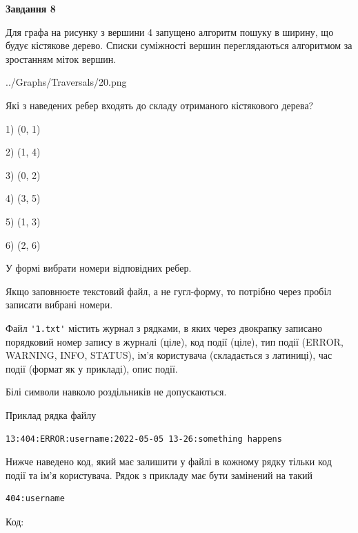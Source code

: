 \documentclass[12pt, ukrainian]{article}
\def\code#1{\Verb!#1!}
\begin{document}
{\begin {large}
{\begin {center}\textbf{Завдання 8}\end {center}}\par
Для графа на рисунку з вершини 4 запущено алгоритм пошуку в ширину, що будує кістякове дерево. Списки суміжності вершин переглядаються алгоритмом за зростанням міток вершин.\par
\begin{center}
	{../Graphs/Traversals/20.png}
\end{center}
\par Які з наведених ребер входять до складу отриманого кістякового дерева?\par
1) (0, 1)\par
2) (1, 4)\par
3) (0, 2)\par
4) (3, 5)\par
5) (1, 3)\par
6) (2, 6)\par
{\vskip 15pt} У формі вибрати номери відповідних ребер.


Якщо заповнюєте текстовий файл, а не гугл-форму, то потрібно через пробіл записа\-ти вибрані номери.\par
\newpage


Файл \code{'1.txt'} містить журнал з рядками, в яких через двокрапку записано поряд\-ко\-вий номер запису в журналі (ціле), код події (ціле), тип події (ERROR, \\WARNING, INFO, STATUS), ім'я користувача (складається з латиниці), час події (фор\-мат як у прикладі), опис події.

Білі символи навколо роздільників не допускаються.

Приклад рядка файлу



\begin{verbatim}
13:404:ERROR:username:2022-05-05 13-26:something happens
\end{verbatim}


Нижче наведено код, який має залишити у файлі в кожному рядку тільки код події та ім'я користувача. Рядок з прикладу має бути замінений на такий



\begin{verbatim}
404:username
\end{verbatim}




Код:




\end{large}}
\end{document}
